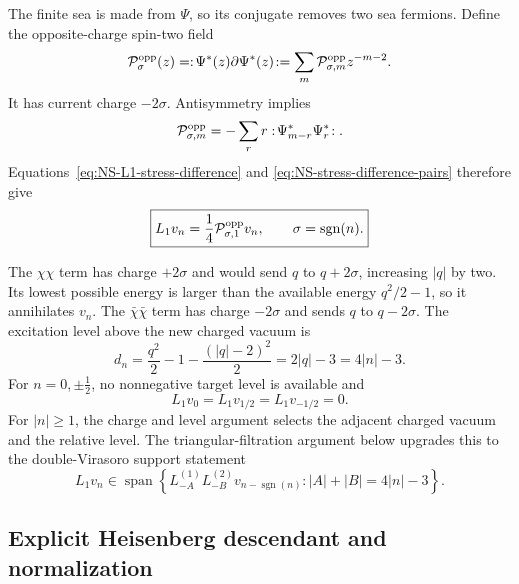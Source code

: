 \documentclass[11pt]{article}
\begin{document}
The finite sea is made from \(\Psi\), so its conjugate removes two sea
fermions.  Define the opposite-charge spin-two field
\begin{equation}
 {\cal P}^{\mathrm{opp}}_\sigma(z)
 =:\!\Psi^*(z)\partial\Psi^*(z)\!:
 =\sum_m{\cal P}^{\mathrm{opp}}_{\sigma,m}z^{-m-2}.
 \label{eq:NS-pair-fields}
\end{equation}
It has current charge \(-2\sigma\).  Antisymmetry implies
\begin{equation}
 {\cal P}^{\mathrm{opp}}_{\sigma,m}
 =-\sum_r r:\!\Psi^*_{m-r}\Psi^*_r\!:.
\end{equation}
Equations~\eqref{eq:NS-L1-stress-difference} and
\eqref{eq:NS-stress-difference-pairs} therefore give
\begin{equation}
 \boxed{
 L_1v_n=\frac14{\cal P}^{\mathrm{opp}}_{\sigma,1}v_n,
 \qquad \sigma=\operatorname{sgn}(n).}
 \label{eq:NS-L1-pair-field}
\end{equation}

The \(\chi\chi\) term has charge \(+2\sigma\) and would send \(q\) to
\(q+2\sigma\), increasing \(|q|\) by two.  Its lowest possible energy is
larger than the available energy \(q^2/2-1\), so it annihilates \(v_n\).
The \(\bar\chi\bar\chi\) term has charge \(-2\sigma\) and sends \(q\) to
\(q-2\sigma\).  The excitation level above the new charged vacuum is
\begin{equation}
 d_n=\frac{q^2}{2}-1-\frac{(|q|-2)^2}{2}
 =2|q|-3=4|n|-3.
 \label{eq:NS-L1-relative-level}
\end{equation}
For \(n=0,\pm\frac12\), no nonnegative target level is available and
\begin{equation}
 L_1v_0=L_1v_{1/2}=L_1v_{-1/2}=0.
 \label{eq:NS-L1-lowest-zero}
\end{equation}
For \(|n|\geq1\), the charge and level argument selects the adjacent charged
vacuum and the relative level.  The triangular-filtration argument below
upgrades this to the double-Virasoro support statement
\begin{equation}
 \boxed{
 L_1v_n\in
 \operatorname{span}\left\{
 L_{-A}^{(1)}L_{-B}^{(2)}v_{n-\operatorname{sgn}(n)}:
 |A|+|B|=4|n|-3
 \right\}.}
 \label{eq:NS-L1-selection}
\end{equation}

\subsection{Explicit Heisenberg descendant and normalization}
\end{document}
